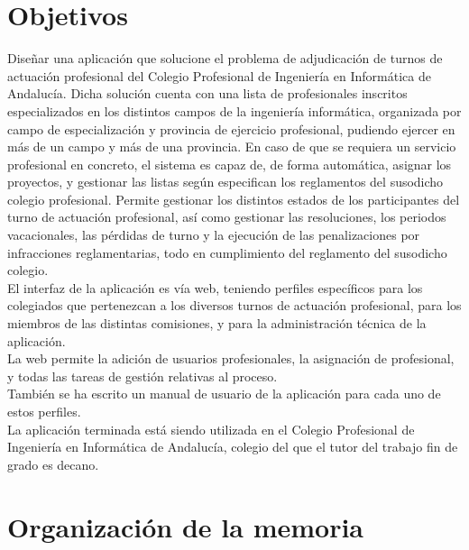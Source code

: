 \documentclass[12pt,a4paper,oneside,spanish]{book}
\newcounter{rf}
\newcounter{ri}
\begin{document}
\section{Objetivos}


Diseñar una aplicación que solucione el problema de adjudicación de turnos de actuación profesional del Colegio Profesional de Ingeniería en Informática de Andalucía. Dicha solución cuenta con una lista de profesionales inscritos especializados en los distintos campos de la ingeniería informática, organizada por campo de especialización y provincia de ejercicio profesional, pudiendo ejercer en más de un campo y más de una provincia. En caso de que se requiera un servicio profesional en concreto, el sistema es capaz de, de forma automática, asignar los proyectos, y gestionar las listas según especifican los reglamentos del susodicho colegio profesional. Permite gestionar los distintos estados de los participantes del turno de actuación profesional, así como gestionar las resoluciones, los periodos vacacionales, las pérdidas de turno y la ejecución de las penalizaciones por infracciones reglamentarias, todo en cumplimiento del reglamento del susodicho colegio. \\

El interfaz de la aplicación es vía web, teniendo perfiles específicos para los colegiados que pertenezcan a los diversos turnos de actuación profesional, para los miembros de las distintas comisiones, y para la administración técnica de la aplicación. \\

La web permite la adición de usuarios profesionales, la asignación de profesional, y todas las tareas de gestión relativas al proceso. \\

También se ha escrito un manual de usuario de la aplicación para cada uno de estos perfiles. \\

La aplicación terminada está siendo utilizada en el Colegio Profesional de Ingeniería en Informática de Andalucía, colegio del que el tutor del trabajo fin de grado es decano.


\section{Organización de la memoria}
\end{document}
